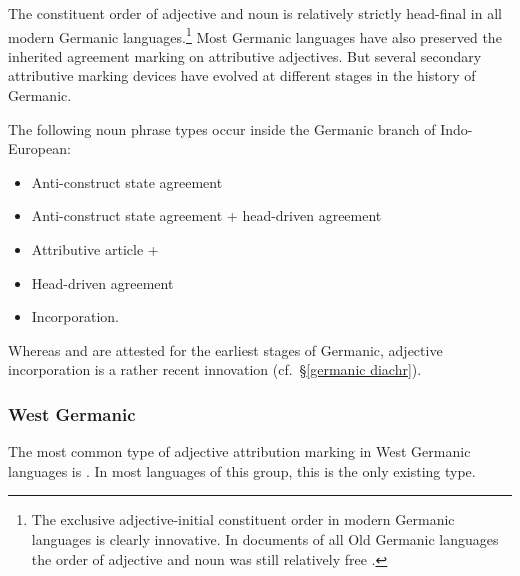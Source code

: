 The constituent order of adjective and noun is relatively strictly head-final in all modern Germanic languages.\footnote{The exclusive adjective-initial constituent order in modern Germanic languages is clearly innovative. In documents of all Old Germanic languages the order of adjective and noun was still relatively free \citep[cf.][]{heinrichs1954}.} Most Germanic languages have also preserved the inherited agreement marking on attributive adjectives. But several secondary attributive marking devices have evolved at different stages in the history of Germanic.

The following noun phrase types occur inside the Germanic branch of Indo-European:
\begin{itemize}
\item{Anti\hyp{}construct state agreement}
\item{Anti\hyp{}construct state agreement + head\hyp{}driven agreement}
\item{Attributive article + }
\item{Head\hyp{}driven agreement}
\item{Incorporation.}
\end{itemize}
Whereas  and  are attested for the earliest stages of Germanic, adjective incorporation is a rather recent innovation (cf.~\S\ref{germanic diachr}).

\subsubsection{West Germanic}\label{w-germanic synchr}
The most common type of adjective attribution marking in West Germanic languages is . In most languages of this group, this is the only existing type.

